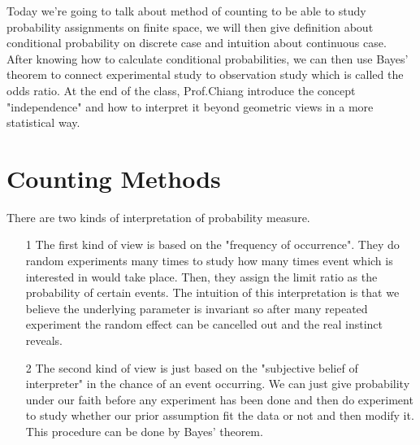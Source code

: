 \documentclass[Probability Theory.tex]{subfiles}
\begin{document}
Today we're going to talk about method of counting to be able to study probability assignments on finite space, we will then give definition about conditional probability on discrete case and intuition about continuous case. After knowing how to calculate conditional probabilities, we can then use Bayes' theorem to connect experimental study to observation study which is called the odds ratio. At the end of the class, Prof.Chiang introduce the concept "independence" and how to interpret it beyond geometric views in a more statistical way.
\section{Counting Methods}
  There are two kinds of interpretation of probability measure. 
\begin{enumerate}
\item[1]
  The first kind of view is based on the "frequency of occurrence". They do random experiments many times to study  how many times event which is interested in would take place. Then, they assign the limit ratio  as the probability of certain events. The intuition of this interpretation is that we believe the underlying parameter is invariant so after many repeated experiment the random effect can be cancelled out and the real instinct reveals. 
\item[2]
  The second kind of view is just based on the "subjective belief of interpreter" in the chance of an event occurring.  We can just give probability under our faith before any experiment has been done and then do experiment to study whether our prior assumption fit the data or not and then modify it. This procedure can be done by Bayes' theorem. 
\end{enumerate}
\end{document}
